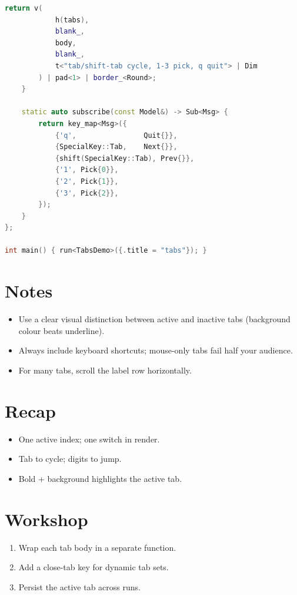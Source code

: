 \begin{lstlisting}[language=C++]
        return v(
            h(tabs),
            blank_,
            body,
            blank_,
            t<"tab/shift-tab cycle, 1-3 pick, q quit"> | Dim
        ) | pad<1> | border_<Round>;
    }

    static auto subscribe(const Model&) -> Sub<Msg> {
        return key_map<Msg>({
            {'q',                Quit{}},
            {SpecialKey::Tab,    Next{}},
            {shift(SpecialKey::Tab), Prev{}},
            {'1', Pick{0}},
            {'2', Pick{1}},
            {'3', Pick{2}},
        });
    }
};

int main() { run<TabsDemo>({.title = "tabs"}); }
\end{lstlisting}

\section{Notes}

\begin{itemize}[leftmargin=*]
  \item Use a clear visual distinction between active and
    inactive tabs (background colour beats underline).
  \item Always include keyboard shortcuts; mouse-only tabs
    fail half your audience.
  \item For many tabs, scroll the label row horizontally.
\end{itemize}

\section{Recap}

\begin{recap}
\begin{itemize}[leftmargin=*]
  \item One active index; one switch in render.
  \item Tab to cycle; digits to jump.
  \item Bold + background highlights the active tab.
\end{itemize}
\end{recap}

\section*{Workshop}

\begin{enumerate}[leftmargin=*]
  \item Wrap each tab body in a separate function.
  \item Add a close-tab key for dynamic tab sets.
  \item Persist the active tab across runs.
\end{enumerate}
